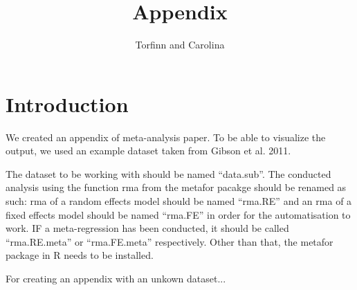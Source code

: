 \documentclass[11pt, a4paper]{article} %
\begin{document}



\title{Appendix}

\author{Torfinn and Carolina}

\maketitle



\section{Introduction}%

We created an appendix of meta-analysis paper. To be able to visualize the output, we used an example dataset taken from Gibson et al. 2011.

The dataset to be working with should be named ``data.sub''. The conducted analysis using the function rma from the metafor pacakge should be renamed as such: rma of a random effects model should be named ``rma.RE'' and an rma of a fixed effects model should be named ``rma.FE'' in order for the automatisation to work. IF a meta-regression has been conducted, it should be called ``rma.RE.meta'' or ``rma.FE.meta'' respectively. Other than that, the metafor package in R needs to be installed.  

For creating an appendix with an unkown dataset... \\
\end{document}
